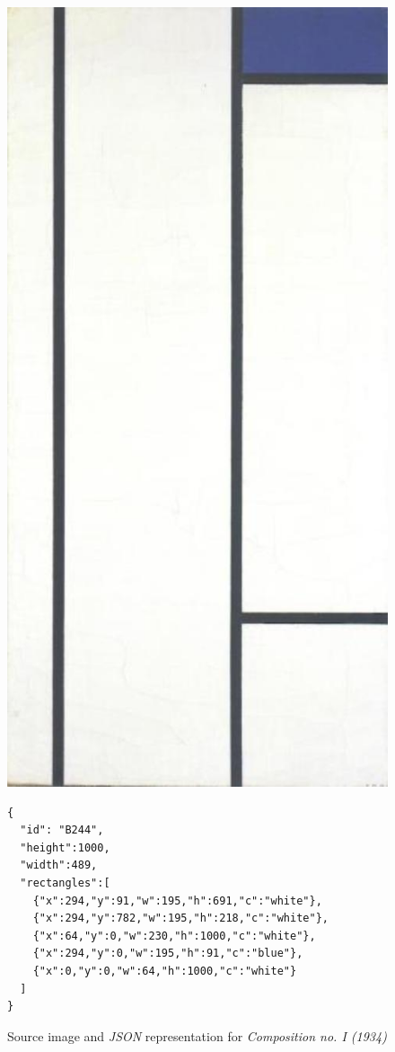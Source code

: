 \documentclass[serif,article,noparskip]{agse-thesis}
\begin{document}
\begin{figure}
\begin{minipage}{0.2\textwidth}
  \includegraphics[width=\linewidth]{images/B244.jpg}
\end{minipage}
\begin{minipage}{0.8\textwidth}
\begin{lstlisting}
{
  "id": "B244",
  "height":1000,
  "width":489,
  "rectangles":[
    {"x":294,"y":91,"w":195,"h":691,"c":"white"},
    {"x":294,"y":782,"w":195,"h":218,"c":"white"},
    {"x":64,"y":0,"w":230,"h":1000,"c":"white"},
    {"x":294,"y":0,"w":195,"h":91,"c":"blue"},
    {"x":0,"y":0,"w":64,"h":1000,"c":"white"}
  ]
}
\end{lstlisting}
\end{minipage}
\caption{Source image and \textit{JSON} representation for \textit{Composition no. I (1934)}}
\label{fig:json}
\end{figure}
\end{document}
